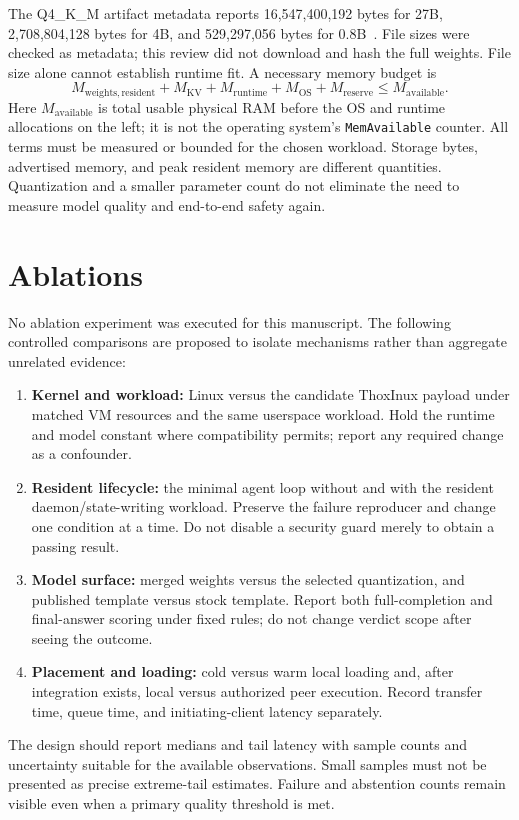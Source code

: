 \documentclass[11pt,a4paper]{article}
\newcommand{\code}[1]{\texttt{#1}}
\begin{document}
The Q4\_K\_M artifact metadata reports 16,547,400,192 bytes for 27B, 2,708,804,128 bytes for 4B, and 529,297,056 bytes for 0.8B~\cite{model27,model4,model08}. File sizes were checked as metadata; this review did not download and hash the full weights. File size alone cannot establish runtime fit. A necessary memory budget is
\begin{equation}
M_{\mathrm{weights,resident}}+M_{\mathrm{KV}}+M_{\mathrm{runtime}}+M_{\mathrm{OS}}+M_{\mathrm{reserve}}\leq M_{\mathrm{available}}.
\end{equation}
Here $M_{\mathrm{available}}$ is total usable physical RAM before the OS and runtime allocations on the left; it is not the operating system's \code{MemAvailable} counter. All terms must be measured or bounded for the chosen workload. Storage bytes, advertised memory, and peak resident memory are different quantities. Quantization and a smaller parameter count do not eliminate the need to measure model quality and end-to-end safety again.

\section{Ablations}
No ablation experiment was executed for this manuscript. The following controlled comparisons are proposed to isolate mechanisms rather than aggregate unrelated evidence:
\begin{enumerate}
\item \textbf{Kernel and workload:} Linux versus the candidate ThoxInux payload under matched VM resources and the same userspace workload. Hold the runtime and model constant where compatibility permits; report any required change as a confounder.
\item \textbf{Resident lifecycle:} the minimal agent loop without and with the resident daemon/state-writing workload. Preserve the failure reproducer and change one condition at a time. Do not disable a security guard merely to obtain a passing result.
\item \textbf{Model surface:} merged weights versus the selected quantization, and published template versus stock template. Report both full-completion and final-answer scoring under fixed rules; do not change verdict scope after seeing the outcome.
\item \textbf{Placement and loading:} cold versus warm local loading and, after integration exists, local versus authorized peer execution. Record transfer time, queue time, and initiating-client latency separately.
\end{enumerate}
The design should report medians and tail latency with sample counts and uncertainty suitable for the available observations. Small samples must not be presented as precise extreme-tail estimates. Failure and abstention counts remain visible even when a primary quality threshold is met.
\end{document}
